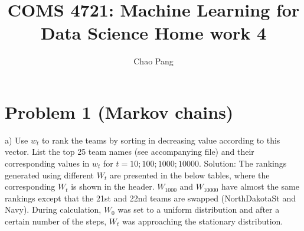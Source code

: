 \documentclass[11pt]{report}
\begin{document}
\title{COMS 4721: Machine Learning for Data Science 
Home work 4}
\author{Chao Pang}
 
\maketitle

\section* {Problem 1 (Markov chains)}
a) Use ${w_t}$ to rank the teams by sorting in decreasing value according to this vector. List the top 25 team names (see accompanying file) and their corresponding values in ${w_t}$ for $t = 10; 100; 1000; 10000$.
\justify Solution: The rankings generated using different $W_{t}$ are presented in the below tables, where the corresponding $W_{t}$ is shown in the header. $W_{1000}$ and $W_{10000}$ have almost the same rankings except that the 21st and 22nd teams are swapped (NorthDakotaSt and Navy). During calculation, $W_{0}$ was set to a uniform distribution and after a certain number of the steps, $W_{t}$ was approaching the stationary distribution.
\end{document}
